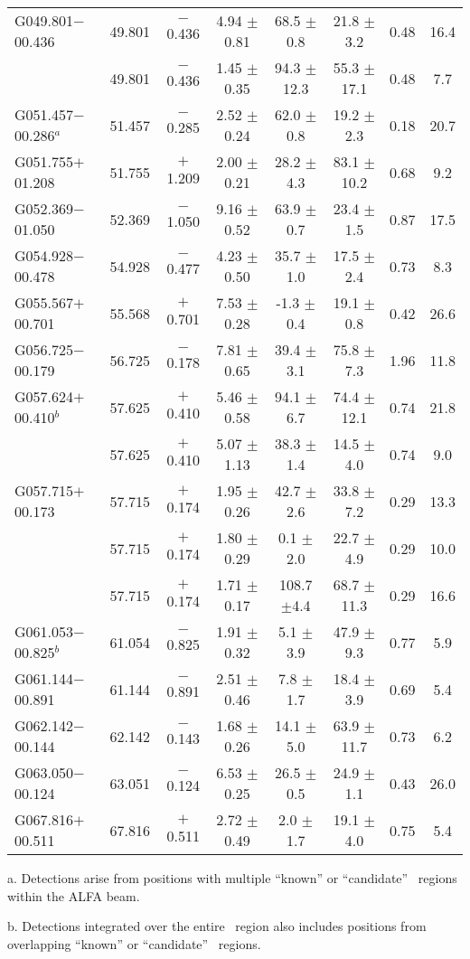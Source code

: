 \begin{ThreePartTable}
\begin{longtable}{lccccccc}
G049.801$-$00.436     &49.801&$-$0.436&4.94	$\pm$0.81&68.5	$\pm$0.8	&21.8	$\pm$3.2	&0.48	&16.4\\
                      &49.801&$-$0.436&1.45	$\pm$0.35&94.3	$\pm$12.3	&55.3	$\pm$17.1	&0.48	&7.7\\
G051.457$-$00.286$^a$ &51.457&$-$0.285&2.52	$\pm$0.24&62.0	$\pm$0.8	&19.2	$\pm$2.3	&0.18	&20.7\\
G051.755$+$01.208     &51.755&$+$1.209&2.00	$\pm$0.21&28.2	$\pm$4.3	&83.1	$\pm$10.2	&0.68	&9.2\\
G052.369$-$01.050     &52.369&$-$1.050&9.16	$\pm$0.52&63.9	$\pm$0.7	&23.4	$\pm$1.5	&0.87	&17.5\\
G054.928$-$00.478     &54.928&$-$0.477&4.23	$\pm$0.50&35.7	$\pm$1.0	&17.5	$\pm$2.4	&0.73	&8.3\\
G055.567$+$00.701     &55.568&$+$0.701&7.53	$\pm$0.28&-1.3	$\pm$0.4	&19.1	$\pm$0.8	&0.42	&26.6\\
G056.725$-$00.179     &56.725&$-$0.178&7.81	$\pm$0.65&39.4	$\pm$3.1	&75.8	$\pm$7.3	&1.96	&11.8\\
G057.624$+$00.410$^b$ &57.625&$+$0.410&5.46	$\pm$0.58&94.1	$\pm$6.7	&74.4	$\pm$12.1	&0.74	&21.8\\
                      &57.625&$+$0.410&5.07	$\pm$1.13&38.3	$\pm$1.4	&14.5	$\pm$4.0	&0.74	&9.0\\
G057.715$+$00.173     &57.715&$+$0.174&1.95	$\pm$0.26&42.7	$\pm$2.6	&33.8	$\pm$7.2	&0.29	&13.3\\
                      &57.715&$+$0.174&1.80	$\pm$0.29&0.1	$\pm$2.0	&22.7	$\pm$4.9	&0.29	&10.0\\
                      &57.715&$+$0.174&1.71	$\pm$0.17&108.7	$\pm$4.4	&68.7	$\pm$11.3	&0.29	&16.6\\
G061.053$-$00.825$^b$ &61.054&$-$0.825&1.91	$\pm$0.32&5.1	$\pm$3.9	&47.9	$\pm$9.3	&0.77	&5.9\\
G061.144$-$00.891     &61.144&$-$0.891&2.51	$\pm$0.46&7.8	$\pm$1.7	&18.4	$\pm$3.9	&0.69	&5.4\\
G062.142$-$00.144     &62.142&$-$0.143&1.68	$\pm$0.26&14.1	$\pm$5.0	&63.9	$\pm$11.7	&0.73	&6.2\\
G063.050$-$00.124     &63.051&$-$0.124&6.53	$\pm$0.25&26.5	$\pm$0.5	&24.9	$\pm$1.1	&0.43	&26.0\\
G067.816$+$00.511     &67.816&$+$0.511&2.72	$\pm$0.49&2.0	$\pm$1.7	&19.1	$\pm$4.0	&0.75	&5.4\\
\end{longtable}
\begin{tablenotes}
	\item a. Detections arise from positions with multiple ``known'' or ``candidate'' \hii\ regions within the ALFA beam.
	\item b. Detections integrated over the entire \hii\ region also includes positions from overlapping ``known'' or ``candidate'' \hii\ regions.
\end{tablenotes}
\end{ThreePartTable}
